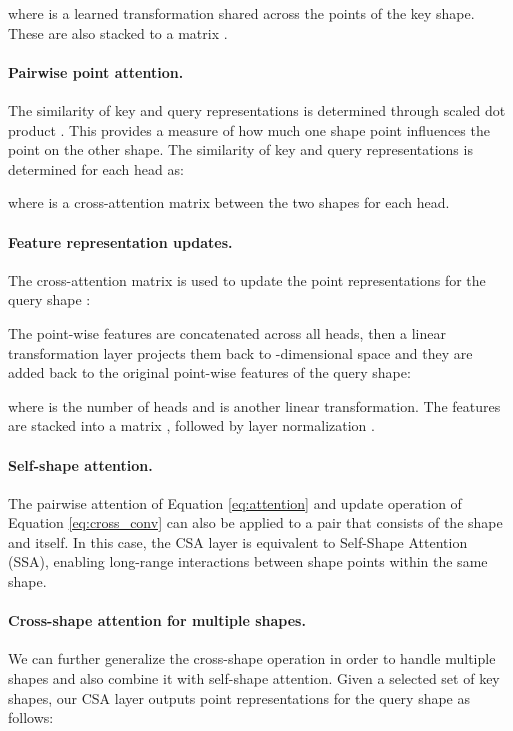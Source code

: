 \documentclass{egpubl}
\begin{document}
\noindent where  is a learned  transformation shared across the points of the key shape. These are also stacked to a matrix .

\vspace{-2.25mm}
\paragraph*{Pairwise point attention.}
The similarity of key and query representations is determined through scaled dot product \cite{Vaswani:2017}. This provides a measure of 
how much one shape point influences the point on the other shape. The similarity of key and query representations is determined for each head  as:

\noindent where  is a  cross-attention matrix 
between the two shapes for each head.

\vspace{-1.75mm}
\paragraph*{Feature representation updates.}
The cross-attention matrix is used to update the point representations for the query shape :

The point-wise features are concatenated across all heads, then a linear transformation layer projects them back to  
-dimensional space and they are added back to the original point-wise features of the query shape: 

\noindent where  is the number of heads and  is another linear transformation. The features are stacked into a matrix , followed by layer normalization \cite{Ba:2016LayerN}.

\vspace{-1.75mm}
\paragraph*{Self-shape attention.}
The pairwise attention of Equation \ref{eq:attention} and update operation of Equation \ref{eq:cross_conv} can also be 
applied to a pair that consists of the shape and itself. In this case, the CSA layer is equivalent to Self-Shape Attention (SSA), 
enabling long-range interactions between shape points within the same shape.

\vspace{-1.75mm}
\paragraph*{Cross-shape attention for multiple shapes.} 
We can further generalize the cross-shape operation in order to handle multiple shapes and  also combine it with
self-shape attention. Given a selected set of key shapes, our CSA layer outputs point representations for the query shape  as follows:
\end{document}
